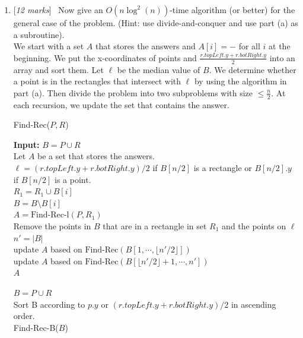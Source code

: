 \documentclass[11pt]{article}
\newcommand{\Q}[1]{\medskip\item {[{\em #1 marks\/}]}\ }
\begin{document}
\begin{enumerate}
\begin{enumerate}
\newpage
\Q{12} Now give an $O(n\log^2(n))$-time algorithm (or better) for the general case of the problem. (Hint: use divide-and-conquer and use part (a) as a subroutine).\\
We start with a set $A$ that stores the answers and $A[i] = -$ for all $i$ at the beginning.
We put the x-coordinates of points and $\frac {r.topLeft.y + r.botRight.y} {2}$ into an array and sort them. Let 
$\ell$ be the median value of $B$. We determine whether a point is in the rectangles that intersect with $\ell$ by 
using the algorithm in part (a). Then divide the problem into two subproblems with size $\leq \frac n 2$.
At each recursion, we update the set that contains the answer.\\

\begin{algorithm} [h]
    \caption{Find-Rec($P, R$)}
     {
    \textbf{Input:}  $B = P \cup R$\\
    Let $A$ be a set that stores the answers. \\
     {
        \Return
    }
    $\ell = (r.topLeft.y + r.botRight.y) / 2$ if $B[n / 2]$ is a rectangle or $B[n / 2].y$ if $B[n / 2]$ 
    is a point.\\
     {
         {
            $R_1 = R_1 \cup B[i]$\\
            $B = B \setminus B[i]$\\
        }
    }
    $A = \text{Find-Rec-l}(P, R_1)$\\
    Remove the points in $B$ that are in a rectangle in set $R_1$ and the points on $\ell$\\
    $n' = \lvert B \rvert$\\
    update $A$ based on $\text{Find-Rec}(B[1, \cdots, \lfloor n' / 2 \rfloor])$\\ 
    update $A$ based on $\text{Find-Rec}(B[\lfloor n' / 2 \rfloor + 1, \cdots, n'])$\\
    \Return $A$
    }

     {
        $B = P \cup R$\\
        Sort B according to $p.y$ or $(r.topLeft.y + r.botRight.y) / 2$ in ascending order.\\
        Find-Rec-B($B$)\\
    }
\end{algorithm}


\end{enumerate}
\end{enumerate}
\end{document}
